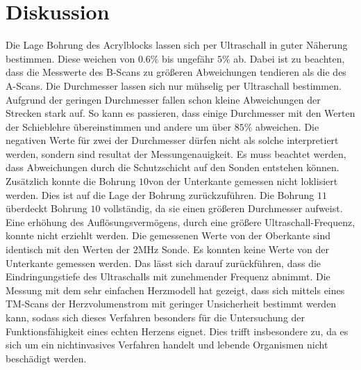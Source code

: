 \section{Diskussion}
\label{sec:Diskussion}
Die Lage Bohrung des Acrylblocks lassen sich per Ultraschall in guter Näherung bestimmen.
Diese weichen von $0.6\%$ bis ungefähr $5\%$ ab.
Dabei ist zu beachten, dass die Messwerte des B-Scans zu größeren Abweichungen tendieren als die des A-Scans.
Die Durchmesser lassen sich nur mühselig per Ultraschall bestimmen.
Aufgrund der geringen Durchmesser fallen schon kleine Abweichungen der Strecken stark auf.
So kann es passieren, dass einige Durchmesser mit den Werten der Schieblehre übereinstimmen und andere um über $85\%$ abweichen.
Die negativen Werte für zwei der Durchmesser dürfen nicht als solche interpretiert werden, sondern sind resultat der Messungenauigkeit.
Es muss beachtet werden, dass Abweichungen durch die Schutzschicht auf den Sonden entstehen können.
Zusätzlich konnte die Bohrung $10$von der Unterkante gemessen nicht loklisiert werden.
Dies ist auf die Lage der Bohrung zurückzuführen.
Die Bohrung $11$ überdeckt Bohrung $10$ vollständig, da sie einen größeren Durchmesser aufweist.
Eine erhöhung des Auflösungsvermögens, durch eine größere Ultraschall-Frequenz, konnte nicht erziehlt werden.
Die gemessenen Werte von der Oberkante sind identisch mit den Werten der $2\si{\mega\hertz}$ Sonde.
Es konnten keine Werte von der Unterkante gemessen werden.
Das lässt sich darauf zurückführen, dass die Eindringungstiefe des Ultraschalls mit zunehmender Frequenz abnimmt.
\noindent Die Messung mit dem sehr einfachen Herzmodell hat gezeigt, dass sich mittels eines TM-Scans der Herzvolumenstrom mit geringer Unsicherheit
bestimmt werden kann, sodass sich dieses Verfahren besonders für die Untersuchung der Funktionsfähigkeit eines echten Herzens eignet.
Dies trifft insbesondere zu, da es sich um ein nichtinvasives Verfahren handelt und lebende Organismen nicht beschädigt werden.
